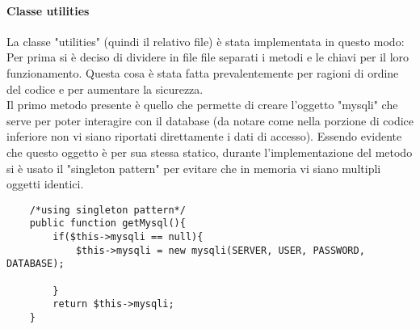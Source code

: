 \paragraph{Classe utilities}
La classe "utilities" (quindi il relativo file) è stata implementata in questo modo:\\
Per prima si è deciso di dividere in file file separati i metodi e le chiavi per il loro funzionamento. Questa cosa è stata fatta prevalentemente per ragioni di ordine del codice e per aumentare la sicurezza.\\
Il primo metodo presente è quello che permette di creare l'oggetto "mysqli" che serve per poter interagire con il database (da notare come nella porzione di codice inferiore non vi siano riportati direttamente i dati di accesso). Essendo evidente che questo oggetto è per sua stessa statico, durante l'implementazione del metodo si è usato il "singleton pattern" per evitare che in memoria vi siano multipli oggetti identici.\\

\begin{verbatim}
	/*using singleton pattern*/
	public function getMysql(){
		if($this->mysqli == null){
			$this->mysqli = new mysqli(SERVER, USER, PASSWORD, DATABASE);
			
		}
		return $this->mysqli;
	}
\end{verbatim}